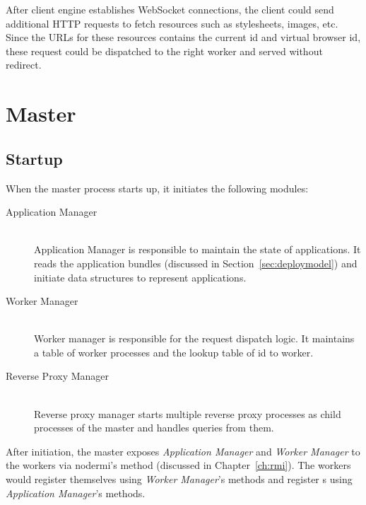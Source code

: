 After client engine establishes WebSocket connections, the client could send
additional HTTP requests to fetch resources such as stylesheets, images, etc.
Since the URLs for these resources contains the current \appins id and virtual
browser id, these request could be dispatched to the right worker and  served
without redirect.

\section{Master}

\subsection{Startup}
When the master process starts up, it initiates the following modules:

\begin{description}
\item[Application Manager] \hfill \\
Application Manager is responsible to maintain the state of applications. It
reads the application bundles (discussed in Section~\ref{sec:deploymodel}) and
initiate data structures to represent applications.

\item[Worker Manager] \hfill \\
Worker manager is responsible for the request dispatch logic.
It maintains a table of worker processes and
the lookup table of \appins id to worker.

\item[Reverse Proxy Manager] \hfill \\
Reverse proxy manager starts multiple reverse proxy processes as child
processes of the master and handles queries from them.
\end{description}

After initiation, the master exposes \emph{Application Manager} and
\emph{Worker Manager} to the workers via nodermi's   method
(discussed in Chapter~\ref{ch:rmi}). The workers would register themselves
using \emph{Worker Manager}'s methods and register \appins{}s using
\emph{Application Manager}'s methods.



